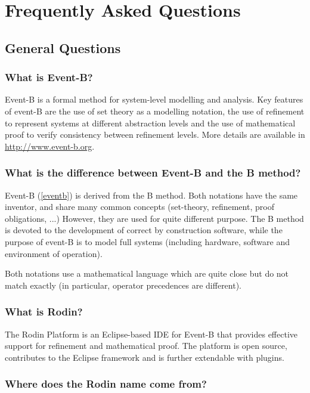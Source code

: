 \chapter{Frequently Asked Questions}

\section{General Questions}

\subsection{What is Event-B?}

Event-B is a formal method for system-level modelling and analysis. Key features of event-B are the use of set theory as a modelling notation, the use of refinement to represent systems at different abstraction levels and the use of mathematical proof to verify consistency between refinement levels.
More details are available in \url{http://www.event-b.org}.

\subsection{What is the difference between Event-B and the B method?}

Event-B (\ref{eventb}) is derived from the B method. Both notations have the same inventor, and share many common concepts (set-theory, refinement, proof obligations, ...) However, they are used for quite different purpose. The B method is devoted to the development of correct by construction software, while the purpose of event-B is to model full systems (including hardware, software and environment of operation).

Both notations use a mathematical language which are quite close but do not match exactly (in particular, operator precedences are different).

\subsection{What is Rodin?}

The Rodin Platform is an Eclipse-based IDE for Event-B that provides effective support for refinement and mathematical proof. The platform is open source, contributes to the Eclipse framework and is further extendable with plugins.

\subsection{Where does the Rodin name come from?}

